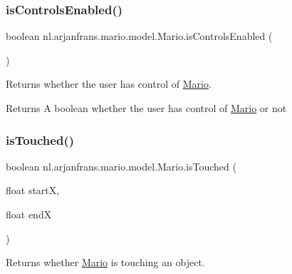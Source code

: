 \subsubsection{\texorpdfstring{is\+Controls\+Enabled()}{isControlsEnabled()}}
{\footnotesize\ttfamily boolean nl.\+arjanfrans.\+mario.\+model.\+Mario.\+is\+Controls\+Enabled (\begin{DoxyParamCaption}{ }\end{DoxyParamCaption})}



Returns whether the user has control of \hyperlink{classnl_1_1arjanfrans_1_1mario_1_1model_1_1Mario}{Mario}. 

\begin{DoxyReturn}{Returns}
A boolean whether the user has control of \hyperlink{classnl_1_1arjanfrans_1_1mario_1_1model_1_1Mario}{Mario} or not 
\end{DoxyReturn}
\mbox{\label{classnl_1_1arjanfrans_1_1mario_1_1model_1_1Mario_ab9f4a29d9ada92deaf71cc9bf7f09ebe}} 
\subsubsection{\texorpdfstring{is\+Touched()}{isTouched()}}
{\footnotesize\ttfamily boolean nl.\+arjanfrans.\+mario.\+model.\+Mario.\+is\+Touched (\begin{DoxyParamCaption}\item[{float}]{startX,  }\item[{float}]{endX }\end{DoxyParamCaption})\hspace{0.3cm}{\ttfamily [private]}}



Returns whether \hyperlink{classnl_1_1arjanfrans_1_1mario_1_1model_1_1Mario}{Mario} is touching an object. 


